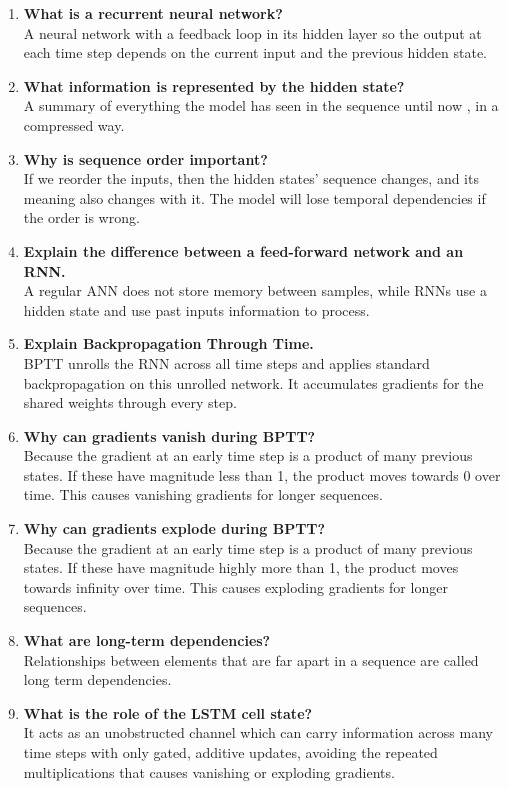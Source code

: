 \documentclass[10pt]{article}
\begin{document}
\begin{enumerate}
\item \textbf{What is a recurrent neural network?} \\A neural network with a feedback loop in its hidden layer so the output at each time step depends on the current input and the previous hidden state.
\item \textbf{What information is represented by the hidden state?} \\A summary of everything the model has seen in the sequence until now , in a compressed way.
\item \textbf{Why is sequence order important?} \\If we reorder the inputs, then the hidden states' sequence changes, and its meaning also changes with it. The model will lose temporal dependencies if the order is wrong.
\item \textbf{Explain the difference between a feed-forward network and an RNN.} \\A regular ANN does not store memory between samples, while RNNs use a hidden state and use past inputs information to process.
\item \textbf{Explain Backpropagation Through Time.} \\BPTT unrolls the RNN across all time steps and applies standard backpropagation on this unrolled network. It accumulates gradients for the shared weights through every step.
\item \textbf{Why can gradients vanish during BPTT?} \\Because the gradient at an early time step is a product of many previous states. If these have magnitude less than 1, the product moves towards 0 over time. This causes vanishing gradients for longer sequences.
\item \textbf{Why can gradients explode during BPTT?} \\Because the gradient at an early time step is a product of many previous states. If these have magnitude highly more than 1, the product moves towards infinity over time. This causes exploding gradients for longer sequences.
\item \textbf{What are long-term dependencies?} \\Relationships between elements that are far apart in a sequence are called long term dependencies.
\item \textbf{What is the role of the LSTM cell state?} \\It acts as an unobstructed channel which can carry information across many time steps with only gated, additive updates, avoiding the repeated multiplications that causes vanishing or exploding gradients.

\end{enumerate}
\end{document}
